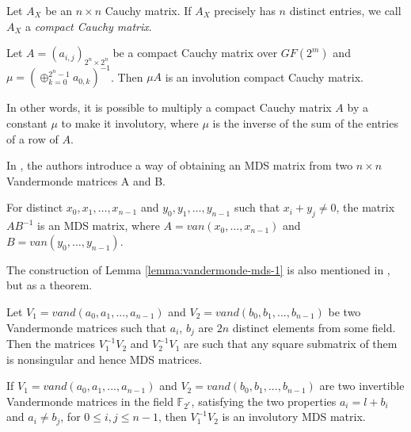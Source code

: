 \begin{definition}
Let $A_X$ be an $n \times n$ Cauchy matrix. If $A_X$ precisely has $n$ distinct entries, we call $A_X$ a \emph{compact Cauchy matrix}.
\end{definition}

\begin{theorem}
Let $A = (a_{i,j})_{2^n\times2^n}$ be a compact Cauchy matrix over $GF(2^m)$ and $\mu = (\oplus ^{2^n-1}_{k=0} a_{0,k})^{-1}$. Then $\mu A$ is an involution compact Cauchy matrix.
\end{theorem}

In other words, it is possible to multiply a compact Cauchy matrix $A$ by a constant $\mu$ to make it involutory, where $\mu$ is the inverse of the sum of the entries of a row of $A$.

In \cite{Gupta2013OnCO}, the authors introduce a way of obtaining an MDS matrix from two $n \times n$ Vandermonde matrices A and B.

\begin{lemma}\label{lemma:vandermonde-mds-1}
For distinct $x_0, x_1, …, x_{n-1}$ and $y_0, y_1, …, y_{n-1}$ such that $x_i + y_j \neq 0$, the matrix $AB^{-1}$ is an MDS matrix, where $A = van(x_0, …, x_{n-1})$ and $B = van(y_0, …, y_{n-1})$.
\end{lemma}

The construction of Lemma \ref{lemma:vandermonde-mds-1} is also mentioned in \cite{RecursiveMDS2017}, but as a theorem.

\begin{theorem}
Let $V_1 = vand(a_0, a_1, ..., a_{n-1})$ and $V_2 = vand(b_0, b_1, ..., b_{n-1})$ be two Vandermonde matrices such that $a_i$, $b_j$ are $2n$ distinct elements from some field. Then the matrices $V_1^{-1}V_2$ and $V_2^{-1}V_1$ are such that any square submatrix of them is nonsingular and hence MDS matrices.
\end{theorem}

\begin{corollary}
If $V_1 = vand(a_0, a_1, ..., a_{n-1})$ and $V_2 = vand(b_0, b_1, ..., b_{n-1})$ are two invertible Vandermonde matrices in the field $\mathbb{F}_{2^r}$, satisfying the two properties $a_i = l + b_i$ and $a_i \neq b_j$, for $0 \leq i,j \leq n - 1$, then $V_1^{-1}V_2$ is an involutory MDS matrix.
\end{corollary}

